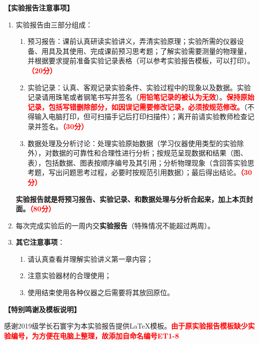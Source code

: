 \documentclass[dvipsnames, svgnames,a4paper,11pt]{article}
\begin{document}
	\textbf{【实验报告注意事项】}
	\begin{enumerate}
		\item 实验报告由三部分组成：
		\begin{enumerate}
			\item 预习报告：课前认真研读实验讲义，弄清实验原理；实验所需的仪器设备、用具及其使用、完成课前预习思考题；了解实验需要测量的物理量，并根据要求提前准备实验记录表格（可以参考实验报告模板，可以打印）。\textcolor{red}{\textbf{（20分）}}
			\item 实验记录：认真、客观记录实验条件、实验过程中的现象以及数据。实验记录请用珠笔或者钢笔书写并签名（\textcolor{red}{\textbf{用铅笔记录的被认为无效}}）。\textcolor{red}{\textbf{保持原始记录，包括写错删除部分，如因误记需要修改记录，必须按规范修改。}}（不得输入电脑打印，但可扫描手记后打印扫描件）；离开前请实验教师检查记录并签名。\textcolor{red}{\textbf{（30分）}}
			\item 数据处理及分析讨论：处理实验原始数据（学习仪器使用类型的实验除外），对数据的可靠性和合理性进行分析；按规范呈现数据和结果（图、表），包括数据、图表按顺序编号及其引用；分析物理现象（含回答实验思考题，写出问题思考过程，必要时按规范引用数据）；最后得出结论。\textcolor{red}{\textbf{（30分）}}
		\end{enumerate}
		\textbf{实验报告就是将预习报告、实验记录、和数据处理与分析合起来，加上本页封面。\textcolor{red}{（80分）}}
		\item 每次完成实验后的一周内交\textbf{实验报告}（特殊情况不能超过两周）。
		\item \textbf{其它注意事项}：
		\begin{enumerate}
			\item 请认真查看并理解实验讲义第一章内容；
			\item 注意实验器材的合理使用；
			\item 使用结束使用各种仪器之后需要将其放回原位。
		\end{enumerate}
	\end{enumerate}
	
	
	
	\textbf{【特别鸣谢及模板说明】}	
	
	感谢2019级学长石寰宇为本实验报告提供\LaTeX 模板。\textcolor{red}{\textbf{由于原实验报告模板缺少实验编号，为方便在电脑上整理，故添加自命名编号ET1-8}}
	
	
	
	\clearpage
	\tableofcontents
	\clearpage
	
\end{document}
